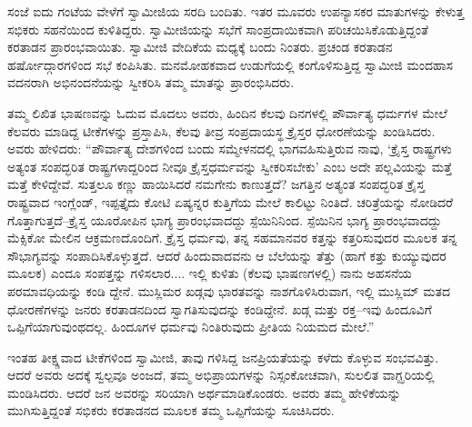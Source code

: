 ಸಂಜೆ ಐದು ಗಂಟೆಯ ವೇಳೆಗೆ ಸ್ವಾಮೀಜಿಯ ಸರದಿ ಬಂದಿತು. ಇತರ ಮೂವರು ಉಪನ್ಯಾಸಕರ ಮಾತುಗಳನ್ನು ಕೇಳುತ್ತ ಸಭಿಕರು ಸಹನೆಯಿಂದ ಕುಳಿತಿದ್ದರು. ಸ್ವಾಮೀಜಿಯನ್ನು ಸಭೆಗೆ ಸಾಂಪ್ರದಾಯಿಕವಾಗಿ ಪರಿಚಯಿಸಿಕೊಡುತ್ತಿದ್ದಂತೆ ಕರತಾಡನ ಪ್ರಾರಂಭವಾಯಿತು. ಸ್ವಾಮೀಜಿ ವೇದಿಕೆಯ ಮಧ್ಯಕ್ಕೆ ಬಂದು ನಿಂತರು. ಪ್ರಚಂಡ ಕರತಾಡನ ಹರ್ಷೋದ್ಗಾರಗಳಿಂದ ಸಭೆ ಕಂಪಿಸಿತು. ಮನಮೋಹಕವಾದ ಉಡುಗೆಯಲ್ಲಿ ಕಂಗೊಳಿಸುತ್ತಿದ್ದ ಸ್ವಾಮೀಜಿ ಮಂದಹಾಸ ವದನರಾಗಿ ಅಭಿನಂದನೆಯನ್ನು ಸ್ವೀಕರಿಸಿ ತಮ್ಮ ಮಾತನ್ನು ಪ್ರಾರಂಭಿಸಿದರು.

ತಮ್ಮ ಲಿಖಿತ ಭಾಷಣವನ್ನು ಓದುವ ಮೊದಲು ಅವರು, ಹಿಂದಿನ ಕೆಲವು ದಿನಗಳಲ್ಲಿ ಪೌರ್ವಾತ್ಯ ಧರ್ಮಗಳ ಮೇಲೆ ಕೆಲವರು ಮಾಡಿದ್ದ ಟೀಕೆಗಳನ್ನು ಪ್ರಸ್ತಾಪಿಸಿ, ಕೆಲವು ತೀವ್ರ ಸಂಪ್ರದಾಯಸ್ಥ ಕ್ರೈಸ್ತರ ಧೋರಣೆಯನ್ನು ಖಂಡಿಸಿದರು. ಅವರು ಹೇಳಿದರು: “ಪೌರ್ವಾತ್ಯ ದೇಶಗಳಿಂದ ಬಂದು ಸಮ್ಮೇಳನದಲ್ಲಿ ಭಾಗವಹಿಸುತ್ತಿರುವ ನಾವು, ‘ಕ್ರೈಸ್ತ ರಾಷ್ಟ್ರಗಳು ಅತ್ಯಂತ ಸಂಪದ್ಭರಿತ ರಾಷ್ಟ್ರಗಳಾದ್ದರಿಂದ ನೀವೂ ಕ್ರೈಸ್ತಧರ್ಮವನ್ನು ಸ್ವೀಕರಿಸಬೇಕು’ ಎಂಬ ಅದೇ ಪಲ್ಲವಿಯನ್ನು ಮತ್ತೆ ಮತ್ತೆ ಕೇಳಿದ್ದೇವೆ. ಸುತ್ತಲೂ ಕಣ್ಣು ಹಾಯಿಸಿದರೆ ನಮಗೇನು ಕಾಣುತ್ತದೆ? ಜಗತ್ತಿನ ಅತ್ಯಂತ ಸಂಪದ್ಭರಿತ ಕ್ರೈಸ್ತ ರಾಷ್ಟ್ರವಾದ ಇಂಗ್ಲೆಂಡ್, ಇಪ್ಪತ್ತೈದು ಕೋಟಿ ಏಷ್ಯನ್ನರ ಕುತ್ತಿಗೆಯ ಮೇಲೆ ಕಾಲಿಟ್ಟು ನಿಂತಿದೆ. ಚರಿತ್ರೆಯನ್ನು ನೋಡಿದರೆ ಗೊತ್ತಾಗುತ್ತದೆ–ಕ್ರೈಸ್ತ ಯೂರೋಪಿನ ಭಾಗ್ಯ ಪ್ರಾರಂಭವಾದದ್ದು ಸ್ಪೆಯಿನಿನಿಂದ. ಸ್ಪೆಯಿನಿನ ಭಾಗ್ಯ ಪ್ರಾರಂಭವಾದದ್ದು ಮೆಕ್ಸಿಕೋ ಮೇಲಿನ ಆಕ್ರಮಣದೊಂದಿಗೆ. ಕ್ರೈಸ್ತ ಧರ್ಮವು, ತನ್ನ ಸಹಮಾನವರ ಕತ್ತನ್ನು ಕತ್ತರಿಸುವುದರ ಮೂಲಕ ತನ್ನ ಸೌಭಾಗ್ಯವನ್ನು ಸಂಪಾದಿಸಿಕೊಳ್ಳುತ್ತದೆ. ಆದರೆ ಹಿಂದುವಾದವನು ಆ ಬೆಲೆಯನ್ನು ತೆತ್ತು (ಹಾಗೆ ಕತ್ತು ಕುಯ್ಯುವುದರ ಮೂಲಕ) ಎಂದೂ ಸಂಪತ್ತನ್ನು ಗಳಿಸಲಾರ.... ಇಲ್ಲಿ ಕುಳಿತು (ಕೆಲವು ಭಾಷಣಗಳಲ್ಲಿ) ನಾನು ಅಹಸನೆಯ ಪರಮಾವಧಿಯನ್ನು ಕಂಡಿ ದ್ದೇನೆ. ಮುಸ್ಲಿಮರ ಖಡ್ಗವು ಭಾರತವನ್ನು ನಾಶಗೊಳಿಸಿರುವಾಗ, ಇಲ್ಲಿ ಮುಸ್ಲಿಮ್ ಮತದ ಧೋರಣೆಗಳನ್ನು ಜನರು ಕರತಾಡನದಿಂದ ಸ್ವಾಗತಿಸುವುದನ್ನು ಕಂಡಿದ್ದೇನೆ. ಖಡ್ಗ ಮತ್ತು ರಕ್ತ–ಇವು ಹಿಂದೂವಿಗೆ ಒಪ್ಪಿಗೆಯಾಗುವುಂಥದಲ್ಲ. ಹಿಂದೂಗಳ ಧರ್ಮವು ನಿಂತಿರುವುದು ಪ್ರೀತಿಯ ನಿಯಮದ ಮೇಲೆ.”

ಇಂತಹ ತೀಕ್ಷ್ಣವಾದ ಟೀಕೆಗಳಿಂದ ಸ್ವಾಮೀಜಿ, ತಾವು ಗಳಿಸಿದ್ದ ಜನಪ್ರಿಯತೆಯನ್ನು ಕಳೆದು ಕೊಳ್ಳುವ ಸಂಭವವಿತ್ತು. ಆದರೆ ಅವರು ಅದಕ್ಕೆ ಸ್ವಲ್ಪವೂ ಅಂಜದೆ, ತಮ್ಮ ಅಭಿಪ್ರಾಯಗಳನ್ನು ನಿಸ್ಸಂಕೋಚವಾಗಿ, ಸುಲಲಿತ ವಾಗ್ಝರಿಯಲ್ಲಿ ಮಂಡಿಸಿದರು. ಆದರೆ ಜನ ಅವರನ್ನು ಸರಿಯಾಗಿ ಅರ್ಥಮಾಡಿಕೊಂಡರು. ಅವರು ತಮ್ಮ ಹೇಳಿಕೆಯನ್ನು ಮುಗಿಸುತ್ತಿದ್ದಂತೆ ಸಭಿಕರು ಕರತಾಡನದ ಮೂಲಕ ತಮ್ಮ ಒಪ್ಪಿಗೆಯನ್ನು ಸೂಚಿಸಿದರು.

